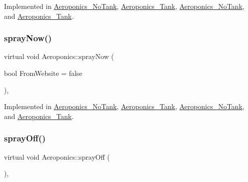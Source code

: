 Implemented in \hyperlink{class_aeroponics___no_tank_a91a9ce3552f1f726d26aa79fad04116e}{Aeroponics\+\_\+\+No\+Tank}, \hyperlink{class_aeroponics___tank_ab4158b1a54f6a1ac4f3eb35fc8854e35}{Aeroponics\+\_\+\+Tank}, \hyperlink{class_aeroponics___no_tank_a91a9ce3552f1f726d26aa79fad04116e}{Aeroponics\+\_\+\+No\+Tank}, and \hyperlink{class_aeroponics___tank_ab4158b1a54f6a1ac4f3eb35fc8854e35}{Aeroponics\+\_\+\+Tank}.

\mbox{\label{class_aeroponics_aecda76aae20ce45fd9a080770cf07e56}} 
\subsubsection{\texorpdfstring{spray\+Now()}{sprayNow()}\hspace{0.1cm}{\footnotesize\ttfamily [2/2]}}
{\footnotesize\ttfamily virtual void Aeroponics\+::spray\+Now (\begin{DoxyParamCaption}\item[{bool}]{From\+Website = {\ttfamily false} }\end{DoxyParamCaption})\hspace{0.3cm}{\ttfamily [protected]}, {}}



Implemented in \hyperlink{class_aeroponics___no_tank_a91a9ce3552f1f726d26aa79fad04116e}{Aeroponics\+\_\+\+No\+Tank}, \hyperlink{class_aeroponics___tank_ab4158b1a54f6a1ac4f3eb35fc8854e35}{Aeroponics\+\_\+\+Tank}, \hyperlink{class_aeroponics___no_tank_a91a9ce3552f1f726d26aa79fad04116e}{Aeroponics\+\_\+\+No\+Tank}, and \hyperlink{class_aeroponics___tank_ab4158b1a54f6a1ac4f3eb35fc8854e35}{Aeroponics\+\_\+\+Tank}.

\mbox{\label{class_aeroponics_a961b5818322eb6d0268d2f2f4763768e}} 
\subsubsection{\texorpdfstring{spray\+Off()}{sprayOff()}\hspace{0.1cm}{\footnotesize\ttfamily [1/2]}}
{\footnotesize\ttfamily virtual void Aeroponics\+::spray\+Off (\begin{DoxyParamCaption}{ }\end{DoxyParamCaption})\hspace{0.3cm}{\ttfamily [protected]}, {}}



